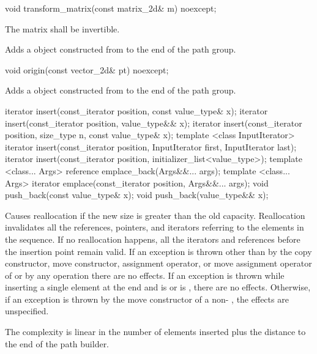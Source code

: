 \begin{itemdecl}
void transform_matrix(const matrix_2d& m) noexcept;
\end{itemdecl}
\begin{itemdescr}
\pnum
\requires
The matrix  shall be invertible.

\pnum
\effects
Adds a  object constructed from  to the end of the path group.
\end{itemdescr}

\begin{itemdecl}
void origin(const vector_2d& pt) noexcept;
\end{itemdecl}
\begin{itemdescr}
\pnum
\effects
Adds a  object constructed from  to the end of the path group.
\end{itemdescr}

\begin{itemdecl}
iterator insert(const_iterator position, const value_type& x);
iterator insert(const_iterator position, value_type&& x);
iterator insert(const_iterator position, size_type n, const value_type& x);
template <class InputIterator>
iterator insert(const_iterator position, InputIterator first,
  InputIterator last);
iterator insert(const_iterator position, initializer_list<value_type>);
template <class... Args>
reference emplace_back(Args&&... args);
template <class... Args>
iterator emplace(const_iterator position, Args&&... args);
void push_back(const value_type& x);
void push_back(value_type&& x);
\end{itemdecl}

\begin{itemdescr}
\pnum
\remarks
Causes reallocation if the new size is greater than the old capacity.
Reallocation invalidates all the references, pointers, and iterators
referring to the elements in the sequence.
If no reallocation happens, all the iterators and references before the insertion point remain valid.
If an exception is thrown other than by
the copy constructor, move constructor,
assignment operator, or move assignment operator of
 or by any  operation
there are no effects.
If an exception is thrown while inserting a single element at the end and
 is  or 
is , there are no effects.
Otherwise, if an exception is thrown by the move constructor of a non-
, the effects are unspecified.

\pnum
\complexity
The complexity is linear in the number of elements inserted plus the 
distance to the end of the path builder.
\end{itemdescr}

